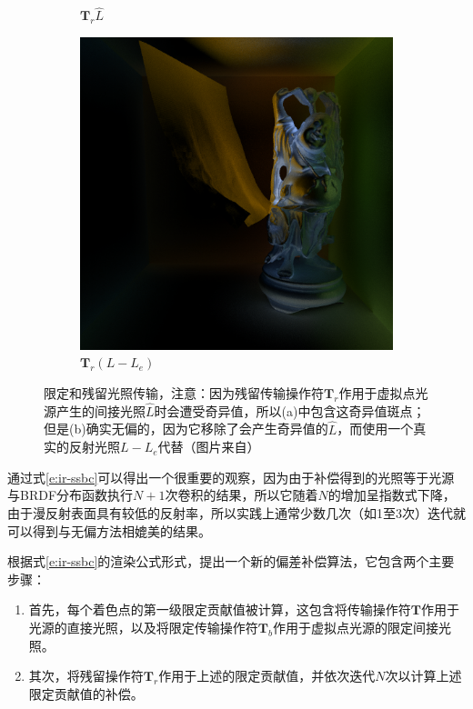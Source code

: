 \begin{figure}
\begin{fullwidth}
\begin{subfigure}[b]{0.195\thewidth}
		\caption{$\mathbf{T}_r\hat{L}$}
	\end{subfigure}
	\begin{subfigure}[b]{0.195\thewidth}
		\includegraphics[width=1.0\textwidth]{figures/ir/ir-7-6}
		\caption{$\mathbf{T}_r(L-L_e)$}
	\end{subfigure}
\caption{限定和残留光照传输，注意：因为残留传输操作符$\mathbf{T}_r$作用于虚拟点光源产生的间接光照$\hat{L}$时会遭受奇异值，所以(a)中包含这奇异值斑点；但是(b)确实无偏的，因为它移除了会产生奇异值的$\hat{L}$，而使用一个真实的反射光照$L-L_e$代替（图片来自\cite{a:Screen-SpaceBiasCompensationfor}）}
\label{f:ir-residual-operator}
\end{fullwidth}
\end{figure}

通过式\ref{e:ir-ssbc}可以得出一个很重要的观察，因为由于补偿得到的光照等于光源与BRDF分布函数执行$N+1$次卷积的结果，所以它随着$N$的增加呈指数式下降，由于漫反射表面具有较低的反射率，所以实践上通常少数几次（如1至3次）迭代就可以得到与无偏方法相媲美的结果。

根据式\ref{e:ir-ssbc}的渲染公式形式，\cite{a:Screen-SpaceBiasCompensationfor}提出一个新的偏差补偿算法，它包含两个主要步骤：

\begin{enumerate}
	\item 首先，每个着色点的第一级限定贡献值被计算，这包含将传输操作符$\mathbf{T}$作用于光源的直接光照，以及将限定传输操作符$\mathbf{T}_b$作用于虚拟点光源的限定间接光照。
	\item 其次，将残留操作符$\mathbf{T}_r$作用于上述的限定贡献值，并依次迭代$N$次以计算上述限定贡献值的补偿。
\end{enumerate}

